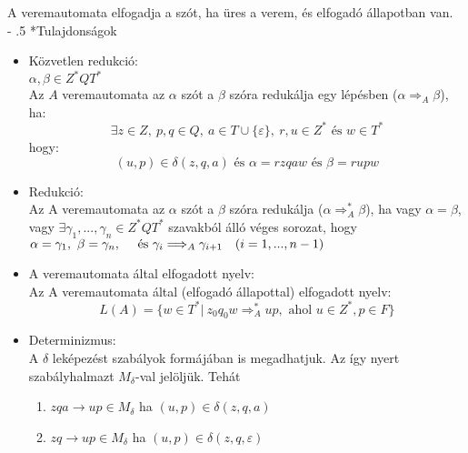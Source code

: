\documentclass[12pt,margin=0px]{article}
\makeatletter
\renewcommand\paragraph{%
	\@startsection{paragraph}{4}{0mm}%
	{-\baselineskip}%
	{.5\baselineskip}%
	{\normalfont\normalsize\bfseries}}
\makeatother
\begin{document}
    \noindent A veremautomata elfogadja a szót, ha üres a verem, és elfogadó állapotban van.\\
							
	\paragraph*{Tulajdonságok}

    \begin{itemize}
        \item Közvetlen redukció: \\
            $\alpha, \beta \in Z^*QT^*$\\
            Az $A$ veremautomata az $\alpha $ szót a $\beta$ szóra redukálja egy lépésben ($\alpha \Longrightarrow_A \beta$), ha:
            \[
                \exists z \in Z, \ p,q \in Q, \ a \in T \cup \{\varepsilon\}, \ r,u \in Z^* \textrm{ és } w\in T^*
            \]
            hogy:
            \[
                (u,p) \in \delta(z,q,a) \textrm{ és } \alpha = rzqaw \textrm{ és } \beta = rupw
            \]
		\item Redukció: \\
            Az A veremautomata az $\alpha$ szót a $\beta$ szóra redukálja ($\alpha \Longrightarrow_A^* \beta$), ha vagy $\alpha = \beta$, vagy
            $ \exists \gamma_1,...,\gamma_n \in Z^*QT^*$ szavakból álló véges sorozat, hogy $\alpha = \gamma_1, \ \beta = \gamma_n, \quad \textrm{ és } \quad \\ {\gamma_i \Longrightarrow_A \gamma_{i+1} \quad (i=1,...,n-1)}$
        \item A veremautomata által elfogadott nyelv: \\
            Az A veremautomata által (elfogadó állapottal) elfogadott nyelv:
            \[
                L(A) = \Big\{ w \in T^* | \ z_0q_0w \Longrightarrow_A^* up, \textrm{ ahol } u \in Z^*, p \in F \Big\}
            \]
		\item Determinizmus: \\
            A $\delta$ leképezést szabályok formájában is megadhatjuk. Az így nyert szabályhalmazt $M_\delta$-val jelöljük. Tehát
            \begin{enumerate}
                \item $zqa \rightarrow up \in M_\delta$ ha $(u, p) \in \delta(z, q, a)$
                \item $zq \rightarrow up \in M_\delta$ ha $(u, p) \in \delta(z, q, \varepsilon)$
            \end{enumerate}
			      								

\end{itemize}
\end{document}
